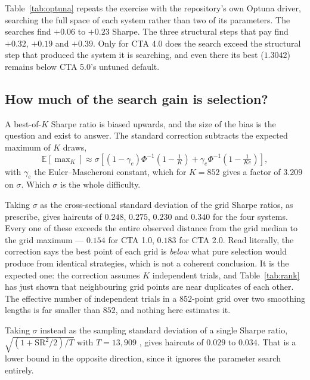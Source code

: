 \documentclass[11pt,a4paper]{article}
\begin{document}
Table~\ref{tab:optuna} repeats the exercise with the repository's own Optuna
driver, searching the full space of each system rather than two of its
parameters. The searches find $+0.06$ to $+0.23$ Sharpe. The three structural
steps that pay find $+0.32$, $+0.19$ and $+0.39$. Only for CTA 4.0 does the
search exceed the structural step that produced the system it is searching,
and even there its best ($1.3042$) remains below CTA 5.0's untuned default.

\subsection{How much of the search gain is selection?}
\label{sec:selection}

A best-of-$K$ Sharpe ratio is biased upwards, and the size of the bias is the
question \citet{bailey2014} and \citet{harvey2015} exist to answer. The
standard correction subtracts the expected maximum of $K$ draws,
\begin{equation}
  \mathbb{E}[\max\nolimits_K] \approx \sigma \left[
    (1-\gamma_e)\Phi^{-1}\!\left(1 - \tfrac{1}{K}\right)
    + \gamma_e \Phi^{-1}\!\left(1 - \tfrac{1}{Ke}\right) \right],
\end{equation}
with $\gamma_e$ the Euler--Mascheroni constant, which for $K = 852$ gives a
factor of $3.209$ on $\sigma$. Which $\sigma$ is the whole difficulty.

Taking $\sigma$ as the cross-sectional standard deviation of the grid Sharpe
ratios, as \citet{bailey2014} prescribe, gives haircuts of $0.248$, $0.275$,
$0.230$ and $0.340$ for the four systems. Every one of these exceeds the
entire observed distance from the grid median to the grid maximum --- $0.154$
for CTA 1.0, $0.183$ for CTA 2.0. Read literally, the correction says the
best point of each grid is \emph{below} what pure selection would produce from
identical strategies, which is not a coherent conclusion. It is the expected
one: the correction assumes $K$ independent trials, and
Table~\ref{tab:rank} has just shown that neighbouring grid points are near
duplicates of each other. The effective number of independent trials in a
$852$-point grid over two smoothing lengths is far smaller than $852$, and
nothing here estimates it.

Taking $\sigma$ instead as the sampling standard deviation of a single Sharpe
ratio, $\sqrt{(1 + \mathrm{SR}^2/2)/T}$ with $T = 13{,}909$
\citep{lo2002}, gives haircuts of $0.029$ to $0.034$. That is a lower bound in
the opposite direction, since it ignores the parameter search entirely.
\end{document}
